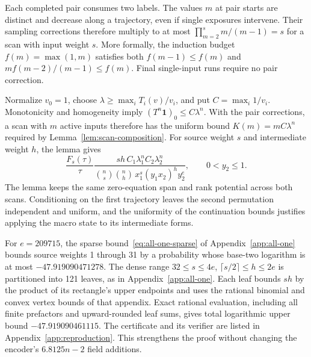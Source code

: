Each completed pair consumes two labels. The values $m$ at pair starts
are distinct and decrease along a trajectory, even if single exposures
intervene. Their sampling corrections therefore multiply to at most
$\prod_{m=2}^s m/(m-1)=s$ for a scan with input weight $s$.
More formally, the induction budget $f(m)=\max(1,m)$ satisfies both
$f(m-1)\le f(m)$ and $mf(m-2)/(m-1)\le f(m)$.
Final single-input runs require no pair correction.

Normalize $v_0=1$, choose $\lambda\ge\max_iT_i(v)/v_i$, and put
$C=\max_i1/v_i$. Monotonicity and homogeneity imply
$(T^n\mathbf1)_0\le C\lambda^n$. With the pair corrections, a scan with
$m$ active inputs therefore has the uniform bound $K(m)=mC\lambda^n$
required by Lemma~\ref{lem:scan-composition}. For source weight $s$ and
intermediate weight $h$, the lemma gives
\[
 \frac{F_s(\tau)}{\tau}
 \frac{sh\,C_1\lambda_1^nC_2\lambda_2^n}
 {\binom ns\binom nh\,x_1^s(y_1x_2)^h y_2^e},
 \qquad 0<y_2\le1.
\]
The lemma keeps the same zero-equation span and rank potential across
both scans. Conditioning on the first trajectory leaves the second
permutation independent and uniform, and the uniformity of the
continuation bounds justifies applying the macro state to its
intermediate forms.

For $e=209715$, the sparse bound~\eqref{eq:all-one-sparse} of
Appendix~\ref{app:all-one} bounds source weights 1 through 31 by a
probability whose base-two logarithm is at most $-47.919090471278$.
The dense range $32\le s\le4e$, $\lceil s/2\rceil\le h\le2e$ is
partitioned into 121 leaves, as in Appendix~\ref{app:all-one}. Each
leaf bounds $sh$ by the product of its rectangle's upper endpoints and
uses the rational binomial and convex vertex bounds of that appendix.
Exact rational evaluation, including all finite prefactors and
upward-rounded leaf sums, gives total logarithmic upper bound
$-47.919090461115$. The certificate and its verifier are listed in
Appendix~\ref{app:reproduction}. This strengthens the proof without
changing the encoder's $6.8125n-2$ field additions.
